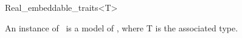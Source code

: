 \begin{ccRefClass}{Real_embeddable_traits<T>}

\ccDefinition

An instance of \ccClassTemplateName\ is a model of , where {\sc T} is the associated type. 


\ccIsModel
{}\\

\end{ccRefClass} 